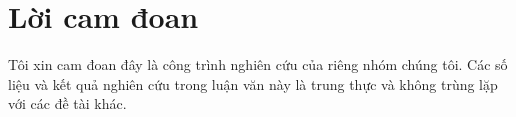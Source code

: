 \chapter*{Lời cam đoan}
\label{reassurances}

Tôi xin cam đoan đây là công trình nghiên cứu của riêng nhóm chúng tôi. Các số liệu và kết quả nghiên cứu trong luận văn này là trung thực và không trùng lặp với các đề tài khác.